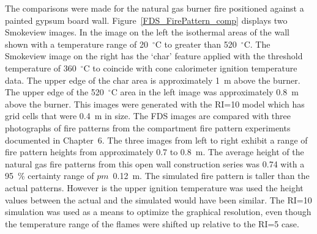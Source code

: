 \documentclass[twoside]{uocthesis}
\begin{document}
{The comparisons were made for the natural gas burner fire positioned against a painted gypsum board wall.  Figure~\ref{FDS_FirePattern_comp} displays two Smokeview images.  In the image on the left the isothermal areas of the wall shown with a temperature range of 20~$^\circ$C to greater than 520~$^\circ$C.  The Smokeview image on the right has the `char' feature applied with the threshold temperature of 360~$^\circ$C to coincide with cone calorimeter ignition temperature data. The upper edge of the char area is approximately 1~m above the burner.  The upper edge of the 520~$^\circ$C area in the left image was approximately 0.8~m above the burner. This images were generated with the RI=10 model which has grid cells that were 0.4~m in size. The FDS images are compared with three photographs of fire patterns from the compartment fire pattern experiments documented in Chapter~6.  The three images from left to right exhibit a range of fire pattern heights from approximately 0.7 to 0.8~m.  The average height of the natural gas fire patterns from this open wall construction series was 0.74 with a 95~\% certainty range of $pm$~0.12~m. The simulated fire pattern is taller than the actual patterns.  However is the upper ignition temperature was used the height values between the actual and the simulated would have been similar.  The RI=10 simulation was used as a means to optimize the graphical resolution, even though the temperature range of the flames were shifted up relative to the RI=5 case.            

}
\end{document}
